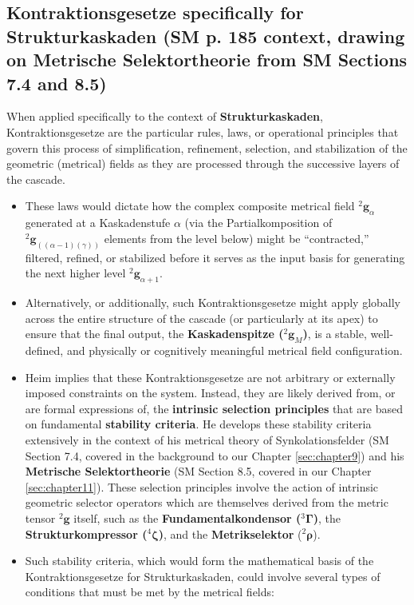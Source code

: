 \documentclass[
    12pt,              %
    a4paper,           %
    headings=normal,   %
    twoside=true,      %
    BCOR=8mm,          %
]{scrbook}
\newcommand{\q}[1]{\enquote{#1}}
\newcommand{\kompositionsfeld}{{}^2\mathbf{g}}
\newcommand{\partialstruktur}[1]{{}^2\mathbf{g}_{(#1)}}
\newcommand{\fundamentalkondensor}{{}^3\bm{\Gamma}}
\newcommand{\kaskadenstufe}{\alpha}
\newcommand{\strukturkompressor}{{}^4\bm{\zeta}}
\begin{document}
\subsection{Kontraktionsgesetze specifically for Strukturkaskaden (SM p. 185 context, drawing on Metrische Selektortheorie from SM Sections 7.4 and 8.5)}
\label{sec:ch9_3_2_kontraktionsgesetze_kaskaden}
When applied specifically to the context of \textbf{Strukturkaskaden}, Kontraktionsgesetze are the particular rules, laws, or operational principles that govern this process of simplification, refinement, selection, and stabilization of the geometric (metrical) fields as they are processed through the successive layers of the cascade.
\begin{itemize}
    \item   These laws would dictate how the complex composite metrical field \(\kompositionsfeld_\alpha\) generated at a Kaskadenstufe \(\kaskadenstufe\) (via the Partialkomposition of \(\partialstruktur{(\alpha-1)(\gamma)}\) elements from the level below) might be \q{contracted,} filtered, refined, or stabilized before it serves as the input basis for generating the next higher level \(\kompositionsfeld_{\alpha+1}\).
    \item   Alternatively, or additionally, such Kontraktionsgesetze might apply globally across the entire structure of the cascade (or particularly at its apex) to ensure that the final output, the \textbf{Kaskadenspitze (\(\kompositionsfeld_M\))}, is a stable, well-defined, and physically or cognitively meaningful metrical field configuration.
    \item   Heim implies that these Kontraktionsgesetze are not arbitrary or externally imposed constraints on the system. Instead, they are likely derived from, or are formal expressions of, the \textbf{intrinsic selection principles} that are based on fundamental \textbf{stability criteria}. He develops these stability criteria extensively in the context of his metrical theory of Synkolationsfelder (SM Section 7.4, covered in the background to our Chapter \ref{sec:chapter9}) and his \textbf{Metrische Selektortheorie} (SM Section 8.5, covered in our Chapter \ref{sec:chapter11}). These selection principles involve the action of intrinsic geometric selector operators which are themselves derived from the metric tensor \(\kompositionsfeld\) itself, such as the \textbf{Fundamentalkondensor (\(\fundamentalkondensor\))}, the \textbf{Strukturkompressor (\(\strukturkompressor\))}, and the \textbf{Metrikselektor} (\({}^2\bm{\rho}\)).
    \item   Such stability criteria, which would form the mathematical basis of the Kontraktionsgesetze for Strukturkaskaden, could involve several types of conditions that must be met by the metrical fields:

\end{itemize}
\end{document}
